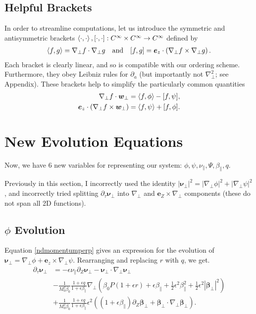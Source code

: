 \documentclass{article}
\newcommand{\para}{\parallel}
\newcommand{\ep}{\epsilon}
\newcommand{\np}{\nabla_\perp}
\newcommand{\p}{\partial}
\newcommand{\fr}{\frac{1+\ep q}{1+\ep\beta_\para}}
\newcommand{\pth} [1] {\left( #1 \right) }
\newcommand{\br} [1] {\left[ #1 \right] }
\begin{document}
\subsection{Helpful Brackets}
In order to streamline computations, let us introduce the symmetric and antisymmetric brackets $\Braket{\cdot,\cdot}, [\cdot,\cdot]: C^\infty\times C^\infty\to C^\infty$ defined by 
\begin{align}
    \Braket{f,g} = \np f\cdot \np g && \text{and} && \br{f,g} = \bm{e}_z\cdot\pth{\np f \times \np g}. 
\end{align}
Each bracket is clearly linear, and so is compatible with our ordering scheme. Furthermore, they obey Leibniz rules for $\p_a$ (but importantly not $\np^2$; see Appendix). These brackets help to simplify the particularly common quantities
\begin{align}
    \np f\cdot \bm{w}_\perp &= \Braket{f, \phi} - [f, \psi], \\ 
    \bm{e}_z \cdot (\np f \times\bm{w}_\perp) &= \Braket{f, \psi} + [f, \phi]. 
\end{align}


\section{New Evolution Equations} \label{newevolutionequations}
Now, we have 6 new variables for representing our system: $\phi,\psi,\nu_\para,\Psi,\beta_\para,q$. 

Previously in this section, I incorrectly used the identity $|\bm{\nu}_\perp|^2 = |\np \phi|^2 + |\np \psi|^2$, and incorrectly tried splitting $\p_\tau\bm{\nu}_\perp$ into $\np$ and $\bm{e}_Z\times\np$ components (these do not span all 2D functions).  

\subsection{$\phi$ Evolution}
Equation \eqref{ndmomentumperp} gives an expression for the evolution of $\bm{\nu}_\perp = \np \phi + \bm{e}_z\times \np\psi$. Rearranging and replacing $r$ with $q$, we get. 
\begin{align} \label{nuperpevolution}
    \p_\tau\bm{\nu}_\perp 
        &= -\ep\nu_\para \p_Z\bm{\nu}_\perp - \bm{\nu}_\perp \cdot\np \bm{\nu}_\perp \nonumber\\ 
        &-\frac{1}{M_0^2\beta_0} \fr \np \pth{\beta_0 P(1+\ep r) + \ep \beta_\para + \frac{1}{2}\ep^2 \beta_\para^2 + \frac{1}{2}\ep^2 |\bm{\beta}_\perp|^2} \nonumber\\ 
        &+ \frac{1}{M_0^2\beta_0} \fr \ep^2 \pth{\pth{1+\ep\beta_\para} \p_Z \bm{\beta}_\perp + \bm{\beta}_\perp \cdot\np \bm{\beta}_\perp}. 
\end{align}
\end{document}
